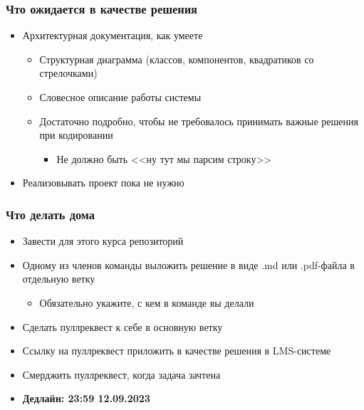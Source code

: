 \documentclass{../../slides-style}
\begin{document}
    \begin{frame}
        \frametitle{Что ожидается в качестве решения}
        \begin{itemize}
            \item Архитектурная документация, как умеете
            \begin{itemize}
                \item Структурная диаграмма (классов, компонентов, квадратиков со стрелочками)
                \item Словесное описание работы системы
                \item Достаточно подробно, чтобы не требовалось принимать важные решения при кодировании
                \begin{itemize}
                    \item Не должно быть <<ну тут мы парсим строку>>
                \end{itemize}
            \end{itemize}
            \item Реализовывать проект пока не нужно
        \end{itemize}
    \end{frame}

    \begin{frame}
        \frametitle{Что делать дома}
        \begin{itemize}
            \item Завести для этого курса репозиторий
            \item Одному из членов команды выложить решение в виде .md или .pdf-файла в отдельную ветку
            \begin{itemize}
                \item Обязательно укажите, с кем в команде вы делали
            \end{itemize}
            \item Сделать пуллреквест к себе в основную ветку
            \item Ссылку на пуллреквест приложить в качестве решения в LMS-системе
            \item Смерджить пуллреквест, когда задача зачтена
            \item \textbf{Дедлайн: 23:59 12.09.2023}
        \end{itemize}
    \end{frame}
\end{document}
